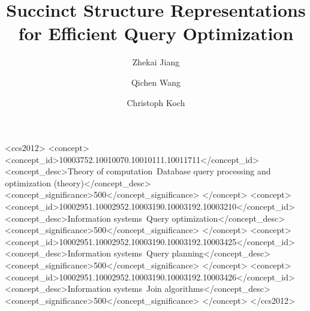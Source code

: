 \documentclass[acmsmall,authorversion,dvipsnames]{acmart}
\begin{document}
\title{Succinct Structure Representations for Efficient Query Optimization}
\author{Zhekai Jiang}

\author{Qichen Wang}
\authornotemark[1]

\author{Christoph Koch}



\begin{CCSXML}
<ccs2012>
   <concept>
       <concept_id>10003752.10010070.10010111.10011711</concept_id>
       <concept_desc>Theory of computation~Database query processing and optimization (theory)</concept_desc>
       <concept_significance>500</concept_significance>
       </concept>
   <concept>
       <concept_id>10002951.10002952.10003190.10003192.10003210</concept_id>
       <concept_desc>Information systems~Query optimization</concept_desc>
       <concept_significance>500</concept_significance>
       </concept>
   <concept>
       <concept_id>10002951.10002952.10003190.10003192.10003425</concept_id>
       <concept_desc>Information systems~Query planning</concept_desc>
       <concept_significance>500</concept_significance>
       </concept>
   <concept>
       <concept_id>10002951.10002952.10003190.10003192.10003426</concept_id>
       <concept_desc>Information systems~Join algorithms</concept_desc>
       <concept_significance>500</concept_significance>
       </concept>
 </ccs2012>
\end{CCSXML}



\maketitle
\sloppy
\end{document}
